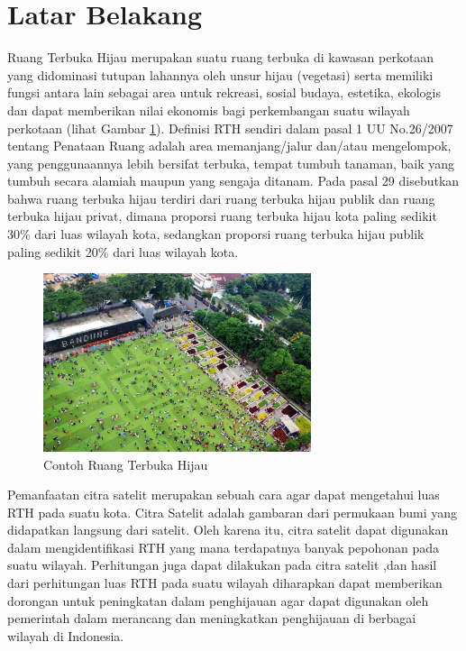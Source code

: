 \documentclass[a4paper,twoside]{article}
\begin{document}
\section{Latar Belakang}
Ruang Terbuka Hijau merupakan suatu ruang terbuka di kawasan perkotaan yang didominasi tutupan lahannya oleh unsur hijau (vegetasi) serta memiliki fungsi antara lain sebagai area untuk rekreasi, sosial budaya, estetika, ekologis dan dapat memberikan nilai ekonomis bagi perkembangan suatu wilayah perkotaan (lihat Gambar \ref{fig:rth}). Definisi RTH sendiri dalam pasal 1 UU No.26/2007 tentang Penataan Ruang adalah area memanjang/jalur dan/atau mengelompok, yang penggunaannya lebih bersifat terbuka, tempat tumbuh tanaman, baik yang tumbuh secara alamiah maupun yang sengaja ditanam. Pada pasal 29 disebutkan bahwa ruang terbuka hijau terdiri dari ruang terbuka hijau publik dan ruang terbuka hijau privat, dimana proporsi ruang terbuka hijau kota paling sedikit 30\% dari luas wilayah kota, sedangkan proporsi ruang terbuka hijau publik paling sedikit 20\% dari luas wilayah kota. %

\begin{figure}[h]
	\centering
	\includegraphics[width=0.7\textwidth]{ruang terbuka hijau.jpg}
	\caption[RTH]{Contoh Ruang Terbuka Hijau\protect\footnotemark}
	\label{fig:rth}
\end{figure}




Pemanfaatan citra satelit merupakan sebuah cara agar dapat mengetahui luas RTH pada suatu kota. Citra Satelit adalah gambaran dari permukaan bumi yang didapatkan langsung dari satelit. Oleh karena itu, citra satelit dapat digunakan dalam mengidentifikasi RTH yang mana terdapatnya banyak pepohonan pada suatu wilayah. Perhitungan juga dapat dilakukan pada citra satelit ,dan hasil dari perhitungan luas RTH pada suatu wilayah diharapkan dapat memberikan dorongan untuk peningkatan dalam penghijauan agar dapat digunakan oleh pemerintah dalam merancang dan meningkatkan penghijauan di berbagai wilayah di Indonesia.
\end{document}
